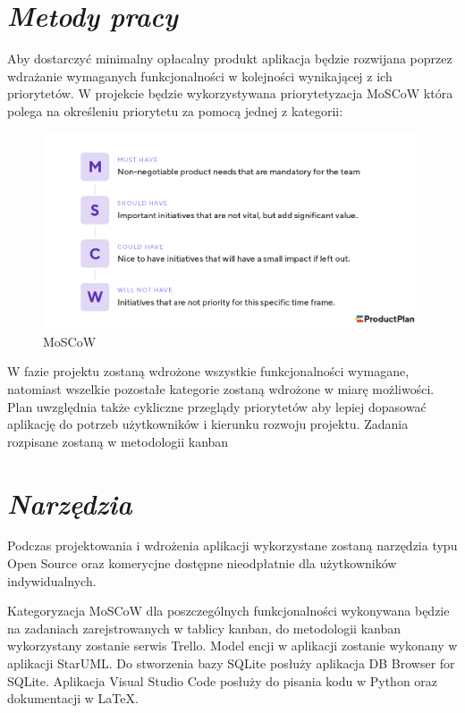 \documentclass[a4paper,10pt]{report}
\newcommand{\customstylesection}[1]{\textbf{\textit{#1}}}
\begin{document}
\section{\customstylesection{Metody pracy}}
{Aby dostarczyć minimalny opłacalny produkt \cite{MVP} aplikacja będzie 
rozwijana poprzez wdrażanie wymaganych funkcjonalności w kolejności wynikającej 
z ich priorytetów. W projekcie będzie wykorzystywana priorytetyzacja MoSCoW 
\cite{MOSCOW} która polega na określeniu priorytetu za pomocą jednej z kategorii:
\begin{figure}[H]           %
    \caption{MoSCoW}
    \label{fig:MoSCoW}
    \centering  
    \includegraphics[width=12cm]{MoSCoW-01.png}
\end{figure}
W fazie projektu zostaną wdrożone wszystkie funkcjonalności wymagane, natomiast  
wszelkie pozostałe kategorie zostaną wdrożone w miarę możliwości. Plan 
uwzględnia także cykliczne przeglądy priorytetów aby lepiej dopasować aplikację 
do potrzeb użytkowników i kierunku rozwoju projektu. Zadania rozpisane zostaną 
w metodologii kanban}

\section{\customstylesection{Narzędzia}}
{Podczas projektowania i wdrożenia aplikacji wykorzystane zostaną narzędzia typu
 Open Source oraz komerycjne dostępne nieodpłatnie dla użytkowników 
indywidualnych.}

{Kategoryzacja MoSCoW dla poszczególnych funkcjonalności wykonywana będzie na 
zadaniach zarejstrowanych w tablicy kanban, do metodologii kanban wykorzystany 
zostanie serwis Trello. Model encji w aplikacji zostanie wykonany w aplikacji 
StarUML. Do stworzenia bazy SQLite posłuży aplikacja DB Browser for SQLite. 
Aplikacja Visual Studio Code posłuży do pisania kodu w Python oraz dokumentacji 
w LaTeX.}
\end{document}
